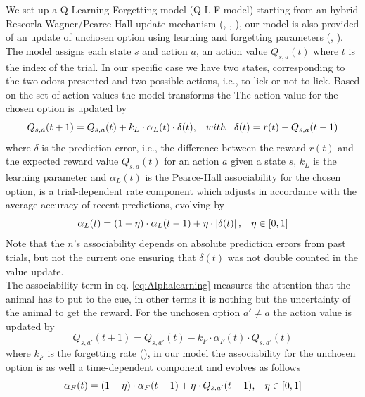 We set up a Q Learning-Forgetting model (Q L-F model) starting from an hybrid Rescorla-Wagner/Pearce-Hall update mechanism (\cite{Koppe}, \cite{Costa}, \cite{Li}), our model is also provided of an update of unchosen option using learning and forgetting parameters (\cite{ItoDoya1}, \cite{Katahira}).
The model assigns each state $s$ and action $a$, an action value $Q_{s,a}(t)$ where $t$ is the index of the trial. In our specific case we have two states, corresponding to the two odors presented and two possible actions, i.e., to lick or not to lick. 
Based on the set of action values the model transforms the The action value for the chosen option is updated by
\begin{equation}
Q_{s,a}(t+1)  = Q_{s,a}(t)+k_L\cdot\alpha_L(t)\cdot\delta(t), \hspace{0.3cm} with \hspace{0.3cm}\delta(t)=r(t)-Q_{s,a}(t-1)
\label{eq:Qlearning}
\end{equation}
where $\delta$ is the prediction error, i.e., the difference between the reward $r(t)$ and the expected reward value $Q_{s,a}(t)$ for an action $a$ given a state $s$, $k_L$ is the learning parameter and $\alpha_L(t)$ is the Pearce-Hall associability for the chosen option, is a trial-dependent rate component which adjusts in accordance with the average accuracy of recent predictions, evolving by
\begin{equation}
   \alpha_L(t)=(1-\eta)\cdot\alpha_L(t-1)+\eta\cdot\left\lvert\delta(t)\right\rvert,\hspace{0.3cm} \eta\in[0,1]
    \label{eq:Alphalearning}
\end{equation}
Note that the $n$'s associability depends on absolute prediction errors from past trials, but not the current one ensuring that $\delta(t)$ was not double counted in the value update.\\The associability term in eq. \ref{eq:Alphalearning} measures the attention that the animal has to put to the cue, in other terms it is nothing but the uncertainty of the animal to get the reward. 
For the unchosen option $a'\neq a$ the action value is updated by
\begin{equation}
    Q_{s,a'}(t+1) = Q_{s,a'}(t)-k_F\cdot\alpha_F(t)\cdot Q_{s,a'}(t)
    \label{eq:Qforgetting}
\end{equation}
where $k_F$ is the forgetting rate (\cite{ItoDoya1}), in our model the associability for the unchosen option is as well a time-dependent component and evolves as follows
\begin{equation}
    \alpha_F(t)=(1-\eta)\cdot\alpha_F(t-1)+\eta\cdot Q_{s,a'}(t-1), \hspace{0.3cm}
    \eta\in[0,1]
    \label{eq:Alphaforgetting}
\end{equation}
